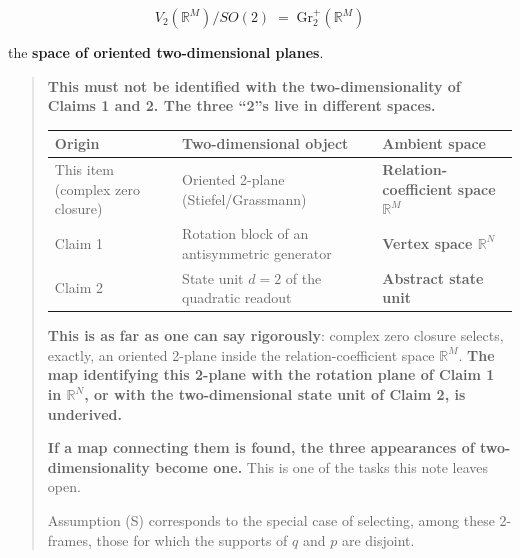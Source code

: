 \documentclass[
  10pt,
]{article}
\newcounter{none} %
\begin{document}
\[V_2(\mathbb{R}^M)/SO(2) \;=\; \mathrm{Gr}_2^{+}(\mathbb{R}^M)\]

the \textbf{space of oriented two-dimensional planes}.

\begin{quote}
\textbf{This must not be identified with the two-dimensionality of
Claims 1 and 2. The three ``2''s live in different spaces.}

{\def\LTcaptype{none} %
\begin{longtable}[]{@{}
  >{\raggedright\arraybackslash}p{}
  >{\raggedright\arraybackslash}p{}
  >{\raggedright\arraybackslash}p{}@{}}
\toprule\noalign{}
\begin{minipage}[b]{\linewidth}\raggedright
Origin
\end{minipage} & \begin{minipage}[b]{\linewidth}\raggedright
Two-dimensional object
\end{minipage} & \begin{minipage}[b]{\linewidth}\raggedright
Ambient space
\end{minipage} \\
\midrule\noalign{}
\endhead
\bottomrule\noalign{}
\endlastfoot
This item (complex zero closure) & Oriented 2-plane (Stiefel/Grassmann)
& \textbf{Relation-coefficient space \(\mathbb{R}^M\)} \\
Claim 1 & Rotation block of an antisymmetric generator & \textbf{Vertex
space \(\mathbb{R}^N\)} \\
Claim 2 & State unit \(d=2\) of the quadratic readout & \textbf{Abstract
state unit} \\
\end{longtable}
}

\textbf{This is as far as one can say rigorously}: complex zero closure
selects, exactly, an oriented 2-plane inside the relation-coefficient
space \(\mathbb{R}^M\). \textbf{The map identifying this 2-plane with
the rotation plane of Claim 1 in \(\mathbb{R}^N\), or with the
two-dimensional state unit of Claim 2, is underived.}

\textbf{If a map connecting them is found, the three appearances of
two-dimensionality become one.} This is one of the tasks this note
leaves open.

Assumption (S) corresponds to the special case of selecting, among these
2-frames, those for which the supports of \(q\) and \(p\) are disjoint.
\end{quote}
\end{document}
